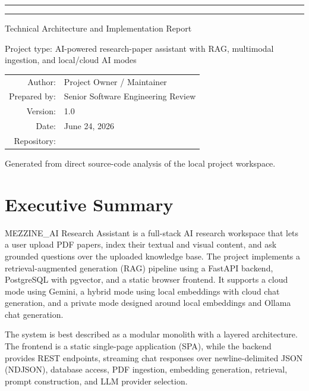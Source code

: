 \documentclass[11pt,a4paper]{report}
\newcommand{\code}[1]{\texttt{\detokenize{#1}}}
\newcommand{\projectname}{MEZZINE\_AI Research Assistant}
\begin{document}
\begin{titlepage}
    \centering
    \vspace*{1.5cm}
    {\color{accent}\rule{\textwidth}{1.2pt}\par\vspace{0.8cm}{\Huge\bfseries \projectname\par}\vspace{0.4cm}\rule{0.55\textwidth}{0.8pt}}
    \vspace{0.5cm}
    {\Large Technical Architecture and Implementation Report\par}
    \vspace{1.5cm}
    {\large Project type: AI-powered research-paper assistant with RAG, multimodal ingestion, and local/cloud AI modes\par}
    \vfill
    \begin{tabular}{rl}
        Author: & Project Owner / Maintainer \\
        Prepared by: & Senior Software Engineering Review \\
        Version: & 1.0 \\
        Date: & June 24, 2026 \\
        Repository: & \code{ai-research-assistant}
    \end{tabular}
    \vfill
    {\large Generated from direct source-code analysis of the local project workspace.\par}
\end{titlepage}

\tableofcontents
\listoffigures
\listoftables
\newpage
{}

\chapter{Executive Summary}

\projectname{} is a full-stack AI research workspace that lets a user upload PDF papers, index their textual and visual content, and ask grounded questions over the uploaded knowledge base. The project implements a retrieval-augmented generation (RAG) pipeline using a FastAPI backend, PostgreSQL with pgvector, and a static browser frontend. It supports a cloud mode using Gemini, a hybrid mode using local embeddings with cloud chat generation, and a private mode designed around local embeddings and Ollama chat generation.

The system is best described as a modular monolith with a layered architecture. The frontend is a static single-page application (SPA), while the backend provides REST endpoints, streaming chat responses over newline-delimited JSON (NDJSON), database access, PDF ingestion, embedding generation, retrieval, prompt construction, and LLM provider selection.
\end{document}
